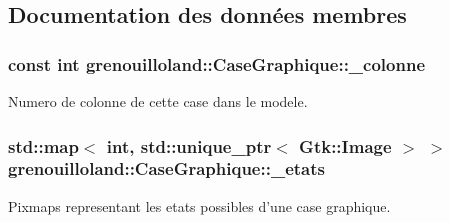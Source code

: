 \subsection{Documentation des données membres}
\hypertarget{classgrenouilloland_1_1CaseGraphique_ae4e49cd04cefb12a3b42e2e57678520a}{
\subsubsection[{\-\_\-colonne}]{\setlength{\rightskip}{0pt plus 5cm}const int grenouilloland\-::\-Case\-Graphique\-::\-\_\-colonne\hspace{0.3cm}{\ttfamily [protected]}}}\label{classgrenouilloland_1_1CaseGraphique_ae4e49cd04cefb12a3b42e2e57678520a}
Numero de colonne de cette case dans le modele. \hypertarget{classgrenouilloland_1_1CaseGraphique_a020fe5a8b0c1e7d803c50ba268ec83d7}{
\subsubsection[{\-\_\-etats}]{\setlength{\rightskip}{0pt plus 5cm}std\-::map$<$ int, std\-::unique\-\_\-ptr$<$ Gtk\-::\-Image $>$ $>$ grenouilloland\-::\-Case\-Graphique\-::\-\_\-etats\hspace{0.3cm}{\ttfamily [protected]}}}\label{classgrenouilloland_1_1CaseGraphique_a020fe5a8b0c1e7d803c50ba268ec83d7}
Pixmaps representant les etats possibles d'une case graphique.

